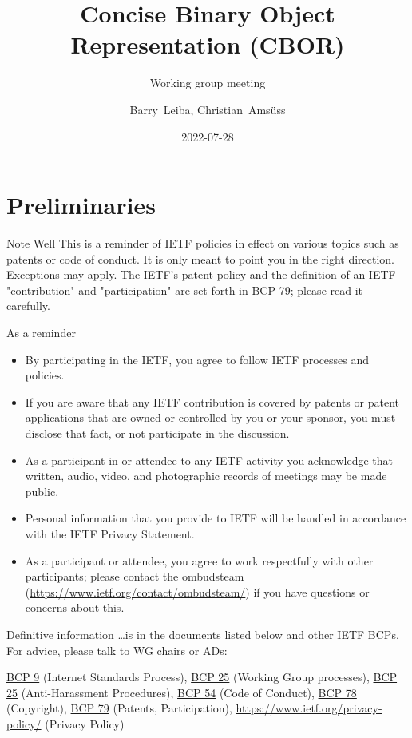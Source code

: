 \documentclass[aspectratio=169]{beamer}
\title{Concise Binary Object Representation (CBOR)}
\subtitle{Working group meeting}
\author{Barry~Leiba, Christian~Amsüss}
\institute{\normalsize{\theietf, Philadelphia}}
\date{2022-07-28}
\begin{document}
\frame{\titlepage}

\section*{Preliminaries}

\begin{frame}{Note Well}\scriptsize
This is a reminder of IETF policies in effect on various topics such as patents or code of conduct. It is only meant to point you in the right direction. Exceptions may apply. The IETF's patent policy and the definition of an IETF "contribution" and "participation" are set forth in BCP 79; please read it carefully.

    \begin{block}{\small As a reminder\qquad\mbox{}}

    \vspace{-1.65em}

    \begin{itemize}
        \item By participating in the IETF, you agree to follow IETF processes and policies.
        \item If you are aware that any IETF contribution is covered by patents or patent applications that are owned or controlled by you or your sponsor, you must disclose that fact, or not participate in the discussion.
        \item As a participant in or attendee to any IETF activity you acknowledge that written, audio, video, and photographic records of meetings may be made public.
        \item Personal information that you provide to IETF will be handled in accordance with the IETF Privacy Statement.
        \item As a participant or attendee, you agree to work respectfully with other participants; please contact the ombudsteam (\url{https://www.ietf.org/contact/ombudsteam/}) if you have questions or concerns about this.
    \end{itemize}

    \end{block}

    \vspace{-1em}
    \begin{block}{\small Definitive information}
\ldots is in the documents listed below and other IETF BCPs. For advice, please talk to WG chairs or ADs:

\href{https://www.rfc-editor.org/info/bcp9}{BCP 9} (Internet Standards Process),
\href{https://www.rfc-editor.org/info/bcp25}{BCP 25} (Working Group processes),
\href{https://www.rfc-editor.org/info/bcp25}{BCP 25} (Anti-Harassment Procedures),
\href{https://www.rfc-editor.org/info/bcp54}{BCP 54} (Code of Conduct),
\href{https://www.rfc-editor.org/info/bcp78}{BCP 78} (Copyright),
\href{https://www.rfc-editor.org/info/bcp79}{BCP 79} (Patents, Participation),
\url{https://www.ietf.org/privacy-policy/} (Privacy Policy)
    \end{block}
\end{frame}
\end{document}
